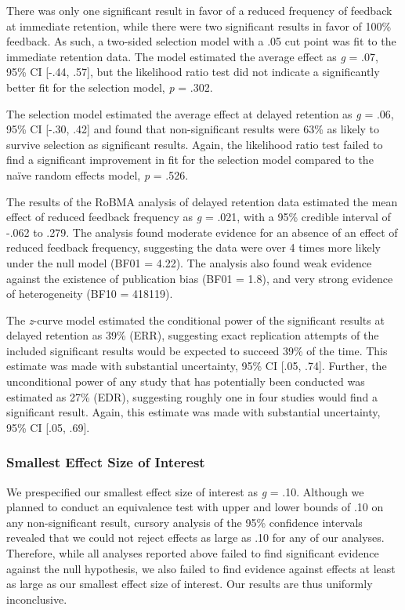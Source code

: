 \documentclass[
  english,
  man,mask,floatsintext]{apa7}
\begin{document}
There was only one significant result in favor of a reduced frequency of feedback at immediate retention, while there were two significant results in favor of 100\% feedback. As such, a two-sided selection model with a .05 cut point was fit to the immediate retention data. The model estimated the average effect as \emph{g} = .07, 95\% CI {[}-.44, .57{]}, but the likelihood ratio test did not indicate a significantly better fit for the selection model, \emph{p} = .302.

The selection model estimated the average effect at delayed retention as \emph{g} = .06, 95\% CI {[}-.30, .42{]} and found that non-significant results were 63\% as likely to survive selection as significant results. Again, the likelihood ratio test failed to find a significant improvement in fit for the selection model compared to the naïve random effects model, \emph{p} = .526.

The results of the RoBMA analysis of delayed retention data estimated the mean effect of reduced feedback frequency as \emph{g} = .021, with a 95\% credible interval of -.062 to .279. The analysis found moderate evidence for an absence of an effect of reduced feedback frequency, suggesting the data were over 4 times more likely under the null model (BF01 = 4.22). The analysis also found weak evidence against the existence of publication bias (BF01 = 1.8), and very strong evidence of heterogeneity (BF10 = 418119).

The \emph{z}-curve model estimated the conditional power of the significant results at delayed retention as 39\% (ERR), suggesting exact replication attempts of the included significant results would be expected to succeed 39\% of the time. This estimate was made with substantial uncertainty, 95\% CI {[}.05, .74{]}. Further, the unconditional power of any study that has potentially been conducted was estimated as 27\% (EDR), suggesting roughly one in four studies would find a significant result. Again, this estimate was made with substantial uncertainty, 95\% CI {[}.05, .69{]}.

\hypertarget{smallest-effect-size-of-interest}{%
\subsubsection{Smallest Effect Size of Interest}\label{smallest-effect-size-of-interest}}

We prespecified our smallest effect size of interest as \emph{g} = .10. Although we planned to conduct an equivalence test with upper and lower bounds of .10 on any non-significant result, cursory analysis of the 95\% confidence intervals revealed that we could not reject effects as large as .10 for any of our analyses. Therefore, while all analyses reported above failed to find significant evidence against the null hypothesis, we also failed to find evidence against effects at least as large as our smallest effect size of interest. Our results are thus uniformly inconclusive.
\end{document}
